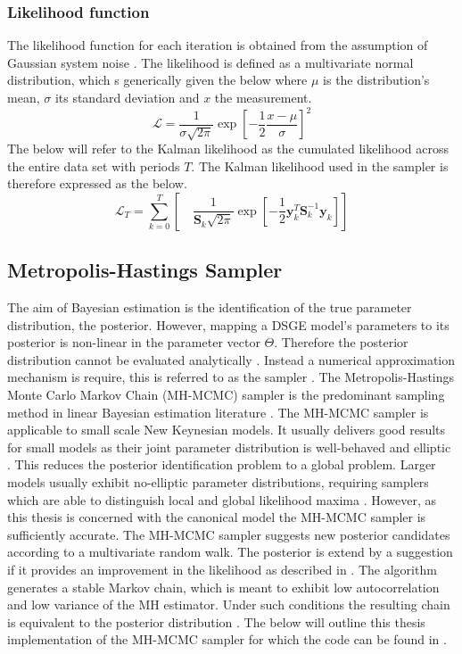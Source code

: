 \documentclass[12pt,a4paper,english]{article} %
\newcommand{\matr}[1]{\mathbf{#1}} %
\newcommand{\Lagr}{\mathcal{L}} %
\begin{document}
	\subsubsection{Likelihood function} \label{kalman_ll}
	The likelihood function for each iteration is obtained from the assumption of Gaussian system noise \cite{kalman_new_1960}. The likelihood is defined as a multivariate normal distribution, which s generically given the below where $\mu$ is the distribution's mean, $\sigma$ its standard deviation and $x$ the measurement.
	\begin{equation}
		\Lagr = \frac{1}{\sigma \sqrt{2 \pi}} \exp [- \frac{1}{2} \frac{x - \mu}{\sigma}]^2
	\end{equation}
	The below will refer to the Kalman likelihood as the cumulated likelihood across the entire data set with periods $T$. The Kalman likelihood used in the sampler is therefore expressed as the below.
	\begin{equation}
		\Lagr_T = \sum_{k=0}^{T} \left[ \quad \frac{1}{\matr{S}_k \sqrt{2 \pi}} \exp [- \frac{1}{2} \matr{y}_k^{T} \matr{S}_{k}^{-1} \matr{y}_k] \right]
	\end{equation}
		
	\subsection{Metropolis-Hastings Sampler}
	The aim of Bayesian estimation is the identification of the true parameter distribution, the posterior. However, mapping a DSGE model's parameters to its posterior is non-linear in the parameter vector $\Theta$. Therefore the posterior distribution cannot be evaluated analytically \cite{herbst_bayesian_2016}. Instead a numerical approximation mechanism is require, this is referred to as the sampler \cite{guerron-quintana_bayesian_2013}. The Metropolis-Hastings Monte Carlo Markov Chain (MH-MCMC) sampler is the predominant sampling method in linear Bayesian estimation literature \cite{guerron-quintana_bayesian_2013}. The MH-MCMC sampler is applicable to small scale New Keynesian models. It usually delivers good results for small models as their joint parameter distribution is well-behaved and elliptic \cite{herbst_bayesian_2016}. This reduces the posterior identification problem to a global problem. Larger models usually exhibit no-elliptic parameter distributions, requiring samplers which are able to distinguish local and global likelihood maxima \cite{herbst_bayesian_2016}. However, as this thesis is concerned with the canonical model the MH-MCMC sampler is sufficiently accurate.	
	The MH-MCMC sampler suggests new posterior candidates according to a multivariate random walk. The posterior is extend by a suggestion if it provides an improvement in the likelihood as described in . The algorithm generates a stable Markov chain, which is meant to exhibit low autocorrelation and low variance of the MH estimator. Under such conditions the resulting chain is equivalent to the posterior distribution \cite{herbst_bayesian_2016}. The below will outline this thesis implementation of the MH-MCMC sampler for which the code can be found in . \\
\end{document}
